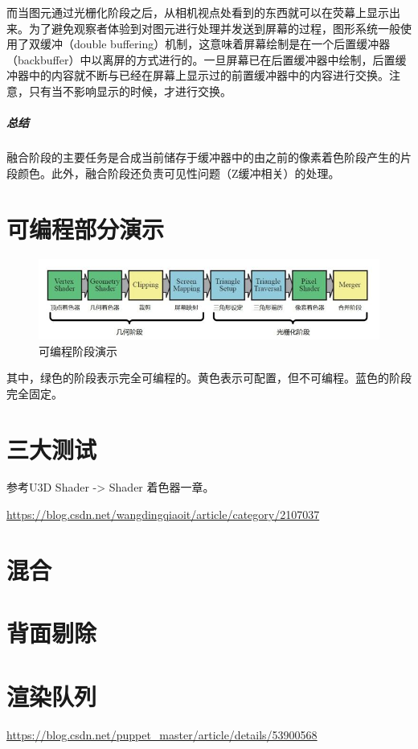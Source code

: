 \documentclass[UTF8,a4paper,12pt]{ctexbook}
\begin{document}
				而当图元通过光栅化阶段之后，从相机视点处看到的东西就可以在荧幕上显示出来。为了避免观察者体验到对图元进行处理并发送到屏幕的过程，图形系统一般使用了双缓冲（double buffering）机制，这意味着屏幕绘制是在一个后置缓冲器（backbuffer）中以离屏的方式进行的。一旦屏幕已在后置缓冲器中绘制，后置缓冲器中的内容就不断与已经在屏幕上显示过的前置缓冲器中的内容进行交换。注意，只有当不影响显示的时候，才进行交换。
				
				\subparagraph{总结}融合阶段的主要任务是合成当前储存于缓冲器中的由之前的像素着色阶段产生的片段颜色。此外，融合阶段还负责可见性问题（Z缓冲相关）的处理。

	\section{可编程部分演示}
		\begin{figure}[H]
			\centering
			\includegraphics[scale=0.57]{ProgramAble}
			\caption{可编程阶段演示}
		\end{figure}	
		
		其中，\color{olive}绿色的阶段表示完全可编程的。\color{yellow}黄色表示可配置，但不可编程。\color{blue}蓝色的阶段完全固定。\color{black}
		
	\section{三大测试}
		参考U3D Shader -> Shader 着色器一章。
		
		\url{https://blog.csdn.net/wangdingqiaoit/article/category/2107037}
	
	\section{混合}
	
	
	\section{背面剔除}
	
	
	\section{渲染队列}
		\url{https://blog.csdn.net/puppet_master/article/details/53900568}
		
\end{document}
